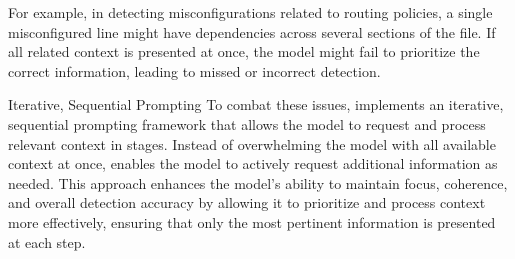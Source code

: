 For example, in detecting misconfigurations related to routing policies, a single misconfigured line might have dependencies across several sections of the file. If all related context is presented at once, the model might fail to prioritize the correct information, leading to missed or incorrect detection.


 Iterative, Sequential Prompting
To combat these issues, \sysname{} implements an iterative, sequential prompting framework that allows the model to request and process relevant context in stages. Instead of overwhelming the model with all available context at once, \sysname{} enables the model to actively request additional information as needed. This approach enhances the model’s ability to maintain focus, coherence, and overall detection accuracy by allowing it to prioritize and process context more effectively, ensuring that only the most pertinent information is presented at each step.

